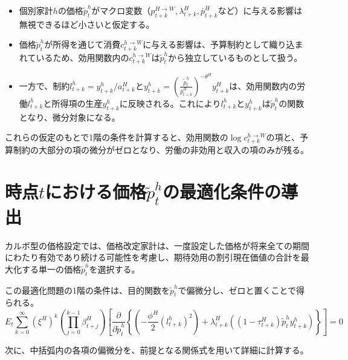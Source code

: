 \begin{itemize}
    \item\label{itm:appendix_optimal_price_derivation_lagrangian_item1}個別家計\(h\)の価格\(\widetilde{p}_t^h\)がマクロ変数（\(p_{t+k}^{H\to W},\lambda_{t+k}^H,\bar{p}_{t+k}^H\)など）に与える影響は無視できるほど小さいと仮定する。
    \item\label{itm:appendix_optimal_price_derivation_lagrangian_item2}価格\(\widetilde{p}_t^h\)が所得を通じて消費\(c_{t+k}^{h\to W}\)に与える影響は、予算制約として織り込まれているため、効用関数内の\(c_{t+k}^{h\to W}\)は\(\widetilde{p}_t^h\)から独立しているものとして扱う。
    \item\label{itm:appendix_optimal_price_derivation_lagrangian_item3}一方で、制約\(l_{t+k}^h=y_{t+k}^h/a_{t+k}^H\)と\(y_{t+k}^h=(\frac{\widetilde{p}_t^h}{\bar{p}_{t+k}^H})^{-\theta^H}y_{t+k}^H\)は、効用関数内の労働\(l_{t+k}^h\)と所得項の生産\(y_{t+k}^h\)に反映される。これにより\(l_{t+k}^h\)と\(y_{t+k}^h\)は\(\widetilde{p}_t^h\)の関数となり、微分対象になる。
\end{itemize}

これらの仮定のもとで1階の条件を計算すると、効用関数の\(\log c_{t+k}^{h\to W}\)の項と、予算制約の大部分の項の微分がゼロとなり、労働の非効用と収入の項のみが残る。

\section{時点\(t\)における価格\(\widetilde{p}_t^h\)の最適化条件の導出}
\label{sec:appendix_optimal_price_derivation_foc}

カルボ型の価格設定では、価格改定家計は、一度設定した価格が将来全ての期間にわたり有効であり続ける可能性を考慮し、期待効用の割引現在価値の合計を最大化する単一の価格\(\widetilde{p}_t^h\)を選択する。



この最適化問題の1階の条件は、目的関数を\(\widetilde{p}_t^h\)で偏微分し、ゼロと置くことで得られる。
\begin{equation}
E_t\sum_{k=0}^{\infty}(\xi^H)^k\left(\prod_{j=0}^{k-1}\beta_{t+j}^H\right)\left[\frac{\partial}{\partial\widetilde{p}_t^h}\left\{\left(-\frac{\phi^H}{2}(l_{t+k}^h)^2\right)+\lambda_{t+k}^H\left((1-\tau_{t+k}^H)\widetilde{p}_t^hy_{t+k}^h\right)\right\}\right]=0
\label{eq:appendix_optimal_price_derivation_foc_raw}
\end{equation}

次に、中括弧内の各項の偏微分を、前提となる関係式を用いて詳細に計算する。

